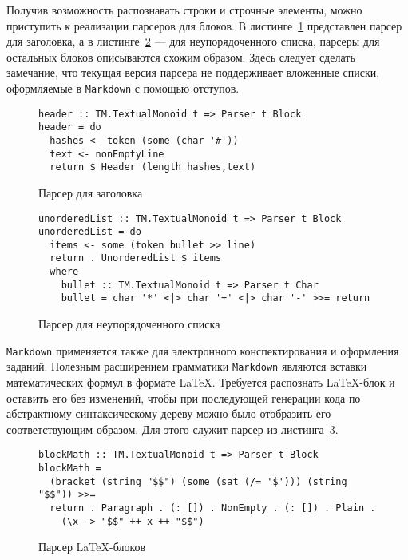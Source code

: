 Получив возможность распознавать строки и строчные элементы, можно приступить к реализации парсеров для блоков. В листинге~\ref{listing:MarkdownHeader} представлен парсер для заголовка, а в листинге~\ref{listing:markdownUlist} --- для неупорядоченного списка, парсеры для остальных блоков описываются схожим образом. Здесь следует сделать замечание, что текущая версия парсера не поддерживает вложенные списки, оформляемые в \lstinline{Markdown} с помощью отступов.

\begin{figure}[t]
\begin{lstlisting}
header :: TM.TextualMonoid t => Parser t Block
header = do
  hashes <- token (some (char '#'))
  text <- nonEmptyLine
  return $ Header (length hashes,text)
\end{lstlisting}
\caption{Парсер для заголовка}
\label{listing:MarkdownHeader}
\end{figure}

\begin{figure}[t]
\begin{lstlisting}
unorderedList :: TM.TextualMonoid t => Parser t Block
unorderedList = do
  items <- some (token bullet >> line)
  return . UnorderedList $ items
  where
    bullet :: TM.TextualMonoid t => Parser t Char
    bullet = char '*' <|> char '+' <|> char '-' >>= return
\end{lstlisting}
\caption{Парсер для неупорядоченного списка}
\label{listing:markdownUlist}
\end{figure}

\lstinline{Markdown} применяется также для электронного конспектирования и
оформления заданий. Полезным расширением грамматики \lstinline{Markdown}
являются вставки математических формул в формате \LaTeX. Требуется распознать
\LaTeX-блок и оставить его без изменений, чтобы при последующей генерации кода
по абстрактному синтаксическому дереву можно было отобразить его соответствующим
образом. Для этого служит парсер из листинга~\ref{listing:MarkdownLaTeX}.

\begin{figure}[h]
\begin{lstlisting}
blockMath :: TM.TextualMonoid t => Parser t Block
blockMath = 
  (bracket (string "$$") (some (sat (/= '$'))) (string "$$")) >>= 
  return . Paragraph . (: []) . NonEmpty . (: []) . Plain .
    (\x -> "$$" ++ x ++ "$$")
\end{lstlisting}
\caption{Парсер \LaTeX-блоков}
\label{listing:MarkdownLaTeX}
\end{figure}

